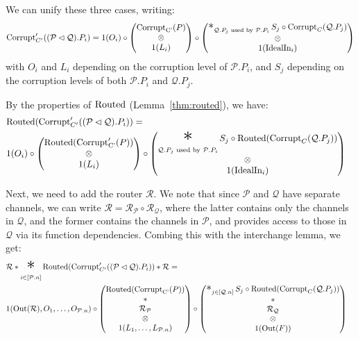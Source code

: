 \begin{theorem}
We can unify these three cases, writing:
$$
\tx{Corrupt}'_{C'}((\mathcal{P} \lhd \mathcal{Q}).P_i) =
1(O_i) \circ
\begin{pmatrix}
  \tx{Corrupt}_{\tx{C'}}(P)\cr
  \otimes\cr
  1(L_i)
\end{pmatrix}
\circ
\begin{pmatrix}
\bigast_{\mathcal{Q}.P_j \tx{ used by } \mathcal{P}.P_i}
  S_j \circ \tx{Corrupt}_C(\mathcal{Q}.P_j)\cr
  \otimes\cr
1(\tx{IdealIn}_i)
\end{pmatrix}
$$
with $O_i$ and $L_i$ depending on the corruption level of $\mathcal{P}.P_i$,
and $S_j$ depending on the corruption levels of both $\mathcal{P}.P_i$
and $\mathcal{Q}.P_j$.

By the properties of $\text{Routed}$ (Lemma~\ref{thm:routed}), we have:
$$
\begin{aligned}
&\tx{Routed}(\tx{Corrupt}'_{C'}((\mathcal{P} \lhd \mathcal{Q}).P_i)) =\cr
&1(O_i) \circ
\begin{pmatrix}
  \tx{Routed}(\tx{Corrupt}'_{\tx{C'}}(P))\cr
  \otimes\cr
  1(L_i)
\end{pmatrix}
\circ
\begin{pmatrix}
\displaystyle\bigast_{\mathcal{Q}.P_j \tx{ used by } \mathcal{P}.P_i}
  S_j \circ \tx{Routed}(\tx{Corrupt}_C(\mathcal{Q}.P_j))\cr
  \otimes\cr
1(\tx{IdealIn}_i)
\end{pmatrix}
\end{aligned}
$$

Next, we need to add the router $\mathcal{R}$.
We note that since $\mathcal{P}$ and $\mathcal{Q}$ have separate channels,
we can write $\mathcal{R} = \mathcal{R}_{\mathcal{P}} \circ \mathcal{R}_{\mathcal{Q}}$,
where the latter contains only the channels in $\mathcal{Q}$,
and the former contains the channels in $\mathcal{P}$,
and provides access to those in $\mathcal{Q}$ via its function dependencies.
Combing this with the interchange lemma, we get:
$$
\begin{aligned}
&\mathcal{R} * \bigast_{i \in [\mathcal{P}.n]}\tx{Routed}(\tx{Corrupt}'_{C'}((\mathcal{P} \lhd \mathcal{Q}).P_i)) * \mathcal{R} =\cr
&1(\tx{Out}(\mathcal{R}), O_1, \ldots, O_{\mathcal{P}.n}) \circ
\begin{pmatrix}
  \tx{Routed}(\tx{Corrupt}_{\tx{C'}}(P))\cr
  *\cr
  \mathcal{R}_{\mathcal{P}}\cr
  \otimes\cr
  1(L_1, \ldots, L_{\mathcal{P}.n})
\end{pmatrix}
\circ
\begin{pmatrix}
\bigast_{j \in [\mathcal{Q}.n]}
  S_j \circ \tx{Routed}(\tx{Corrupt}_C(\mathcal{Q}.P_j))
  \cr
  *\cr
  \mathcal{R}_{\mathcal{Q}}\cr
  \otimes\cr
  1(\tx{Out}(F))
\end{pmatrix}
\end{aligned}
$$


\end{theorem}
